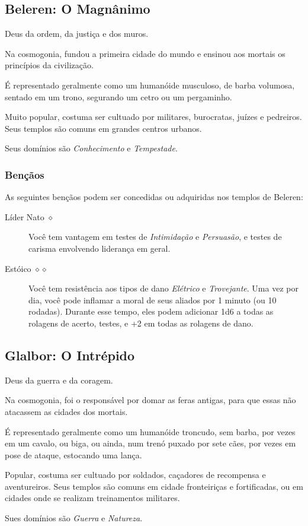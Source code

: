 \documentclass[letterpaper,twocolumn,openany]{dndbook}
\begin{document}
	\subsection{Beleren: O Magnânimo}
	Deus da ordem, da justiça e dos muros.
	\par Na cosmogonia, fundou a primeira cidade do mundo e ensinou aos mortais os princípios da civilização.
	\par É representado geralmente como um humanóide musculoso, de barba volumosa, sentado em um trono, segurando um cetro ou um pergaminho.
	\par Muito popular, costuma ser cultuado por militares, burocratas, juízes e pedreiros. Seus templos são comuns em grandes centros urbanos.
	\par Seus domínios são \textit{Conhecimento} e \textit{Tempestade}.
	\subsubsection{Bençãos}
	As seguintes bençãos podem ser concedidas ou adquiridas nos templos de Beleren:
	\begin{description}
		\item[Líder Nato $\diamond$]
		Você tem vantagem em testes de \textit{Intimidação} e \textit{Persuasão}, e testes de carisma envolvendo liderança em geral.
		\item[Estóico $\diamond\diamond$]
		Você tem resistência aos tipos de dano \textit{Elétrico} e \textit{Trovejante}. Uma vez por dia, você pode inflamar a moral de seus aliados por 1 minuto (ou 10 rodadas). Durante esse tempo, eles podem adicionar 1d6 a todas as rolagens de acerto, testes, e +2 em todas as rolagens de dano.
	\end{description}
	
	\subsection{Glalbor: O Intrépido}
	Deus da guerra e da coragem.
	\par Na cosmogonia, foi o responsável por domar as feras antigas, para que essas não atacassem as cidades dos mortais.
	\par É representado geralmente como um humanóide troncudo, sem barba, por vezes em um cavalo, ou biga, ou ainda, num trenó puxado por sete cães, por vezes em pose de ataque, estocando uma lança.
	\par Popular, costuma ser cultuado por soldados, caçadores de recompensa e aventureiros. Seus templos são comuns em cidade fronteiriças e fortificadas, ou em cidades onde se realizam treinamentos militares.
	\par Sues domínios são \textit{Guerra} e \textit{Natureza}.
\end{document}
